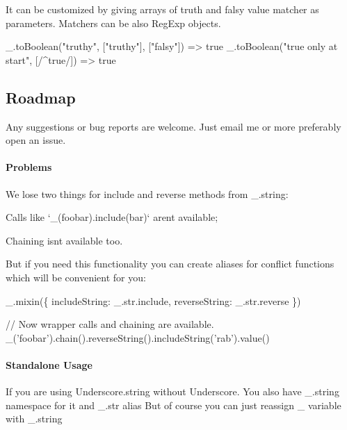 It can be customized by giving arrays of truth and falsy value matcher as parameters. Matchers can be also Reg\+Exp objects.


\begin{DoxyCode}
\_.toBoolean("truthy", ["truthy"], ["falsy"])
=> true
\_.toBoolean("true only at start", [/^true/])
=> true
\end{DoxyCode}


\subsection*{Roadmap}

Any suggestions or bug reports are welcome. Just email me or more preferably open an issue.

\paragraph*{Problems}

We lose two things for {\ttfamily include} and {\ttfamily reverse} methods from {\ttfamily \+\_\+.\+string}\+:


\begin{DoxyItemize}
\item Calls like `\+\_\+(\textquotesingle{}foobar\textquotesingle{}).include(\textquotesingle{}bar\textquotesingle{})` aren\textquotesingle{}t available;
\item Chaining isn\textquotesingle{}t available too.
\end{DoxyItemize}

But if you need this functionality you can create aliases for conflict functions which will be convenient for you\+:


\begin{DoxyCode}
\_.mixin(\{
    includeString: \_.str.include,
    reverseString: \_.str.reverse
\})

// Now wrapper calls and chaining are available.
\_('foobar').chain().reverseString().includeString('rab').value()
\end{DoxyCode}


\paragraph*{Standalone Usage}

If you are using Underscore.\+string without Underscore. You also have {\ttfamily \+\_\+.\+string} namespace for it and {\ttfamily \+\_\+.\+str} alias But of course you can just reassign {\ttfamily \+\_\+} variable with {\ttfamily \+\_\+.\+string}



